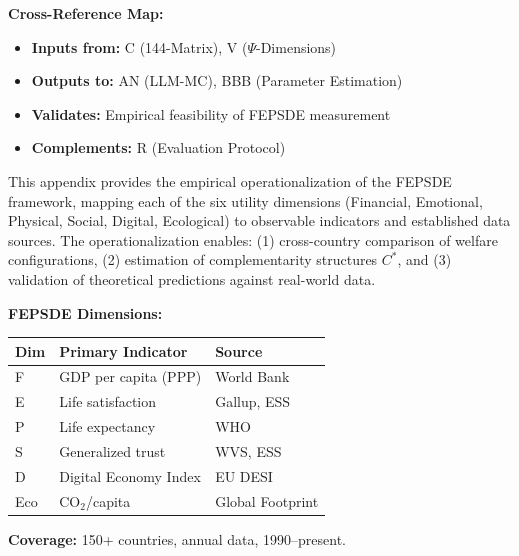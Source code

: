 
\noindent\textbf{Cross-Reference Map:}
\begin{itemize}[nosep]
    \item \textbf{Inputs from:} C (144-Matrix), V ($\Psi$-Dimensions)
    \item \textbf{Outputs to:} AN (LLM-MC), BBB (Parameter Estimation)
    \item \textbf{Validates:} Empirical feasibility of FEPSDE measurement
    \item \textbf{Complements:} R (Evaluation Protocol)
\end{itemize}


\begin{tcolorbox}[colback=green!5!white, colframe=green!75!black,
    title=\textbf{Abstract}]

This appendix provides the empirical operationalization of the FEPSDE framework,
mapping each of the six utility dimensions (Financial, Emotional, Physical,
Social, Digital, Ecological) to observable indicators and established data
sources. The operationalization enables: (1) cross-country comparison of
welfare configurations, (2) estimation of complementarity structures $C^*$,
and (3) validation of theoretical predictions against real-world data.

\end{tcolorbox}


\begin{tcolorbox}[colback=yellow!10!white, colframe=orange!75!black,
    title=\textbf{Quick Reference}]

\textbf{FEPSDE Dimensions:}
\begin{center}
\small
\begin{tabular}{@{}lll@{}}
\toprule
\textbf{Dim} & \textbf{Primary Indicator} & \textbf{Source} \\
\midrule
F & GDP per capita (PPP) & World Bank \\
E & Life satisfaction & Gallup, ESS \\
P & Life expectancy & WHO \\
S & Generalized trust & WVS, ESS \\
D & Digital Economy Index & EU DESI \\
Eco & CO$_2$/capita & Global Footprint \\
\bottomrule
\end{tabular}
\end{center}

\textbf{Coverage:} 150+ countries, annual data, 1990--present.

\end{tcolorbox}

